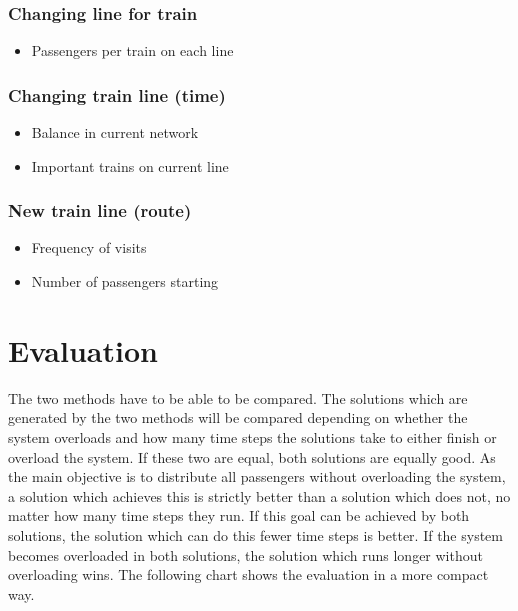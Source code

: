 \documentclass[10pt]{report}
\begin{document}
\subsubsection{Changing line for train}
\begin{itemize}
    \item Passengers per train on each line
\end{itemize}

\subsubsection{Changing train line (time)}
\begin{itemize}
    \item Balance in current network
    \item Important trains on current line
\end{itemize}

\subsubsection{New train line (route)}
\begin{itemize}
    \item Frequency of visits
    \item Number of passengers starting
\end{itemize}

\section{Evaluation}
The two methods have to be able to be compared. The solutions which are generated by the two methods will be compared depending on whether the system overloads and how many time steps the solutions take to either finish or overload the system. If these two are equal, both solutions are equally good. As the main objective is to distribute all passengers without overloading the system, a solution which achieves this is strictly better than a solution which does not, no matter how many time steps they run. If this goal can be achieved by both solutions, the solution which can do this fewer time steps is better. If the system becomes overloaded in both solutions, the solution which runs longer without overloading wins. The following chart shows the evaluation in a more compact way.
\end{document}

